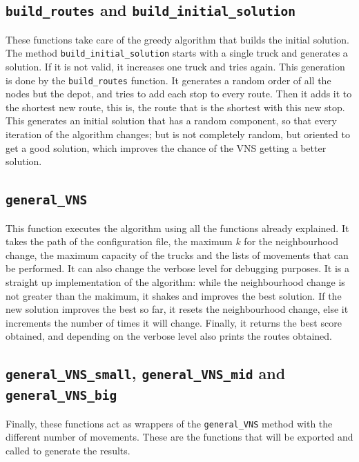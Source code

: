 \documentclass[11pt]{article}
\begin{document}
\subsection{\texttt{build\_routes} and \texttt{build\_initial\_solution}}

These functions take care of the greedy algorithm that builds the initial solution. The method \texttt{build\_initial\_solution} starts with a single truck and generates a solution. If it is not valid, it increases one truck and tries again. This generation is done by the \texttt{build\_routes} function. It generates a random order of all the nodes but the depot, and tries to add each stop to every route. Then it adds it to the shortest new route, this is, the route that is the shortest with this new stop. This generates an initial solution that has a random component, so that every iteration of the algorithm changes; but is not completely random, but oriented to get a good solution, which improves the chance of the VNS getting a better solution. \\

\subsection{\texttt{general\_VNS}}

This function executes the algorithm using all the functions already explained. It takes the path of the configuration file, the maximum $k$ for the neighbourhood change, the maximum capacity of the trucks and the lists of movements that can be performed. It can also change the verbose level for debugging purposes. It is a straight up implementation of the algorithm: while the neighbourhood change is not greater than the makimum, it shakes and improves the best solution. If the new solution improves the best so far, it resets the neighbourhood change, else it increments the number of times it will change. Finally, it returns the best score obtained, and depending on the verbose level also prints the routes obtained. \\


\subsection{\texttt{general\_VNS\_small}, \texttt{general\_VNS\_mid} and \texttt{general\_VNS\_big}}

Finally, these functions act as wrappers of the \texttt{general\_VNS} method with the different number of movements. These are the functions that will be exported and called to generate the results. \\
\end{document}
